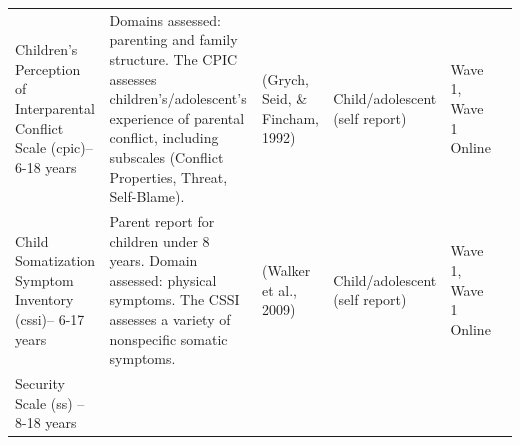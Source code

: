 \documentclass[]{book}
\begin{document}
\begin{longtable}[]{@{}llllll@{}}
\begin{minipage}[t]{0.18\columnwidth}\raggedright
Children's Perception of Interparental Conflict Scale (cpic)-- 6-18 years\strut
\end{minipage} & \begin{minipage}[t]{0.18\columnwidth}\raggedright
Domains assessed: parenting and family structure. The CPIC assesses children's/adolescent's experience of parental conflict, including subscales (Conflict Properties, Threat, Self-Blame).\strut
\end{minipage} & \begin{minipage}[t]{0.15\columnwidth}\raggedright
(Grych, Seid, \& Fincham, 1992)\strut
\end{minipage} & \begin{minipage}[t]{0.16\columnwidth}\raggedright
Child/adolescent (self report)\strut
\end{minipage} & \begin{minipage}[t]{0.06\columnwidth}\raggedright
Wave 1, Wave 1 Online\strut
\end{minipage} & \begin{minipage}[t]{0.10\columnwidth}\raggedright
\strut
\end{minipage}\tabularnewline
\begin{minipage}[t]{0.18\columnwidth}\raggedright
Child Somatization Symptom Inventory (cssi)-- 6-17 years\strut
\end{minipage} & \begin{minipage}[t]{0.18\columnwidth}\raggedright
Parent report for children under 8 years. Domain assessed: physical symptoms. The CSSI assesses a variety of nonspecific somatic symptoms.\strut
\end{minipage} & \begin{minipage}[t]{0.15\columnwidth}\raggedright
(Walker et al., 2009)\strut
\end{minipage} & \begin{minipage}[t]{0.16\columnwidth}\raggedright
Child/adolescent (self report)\strut
\end{minipage} & \begin{minipage}[t]{0.06\columnwidth}\raggedright
Wave 1, Wave 1 Online\strut
\end{minipage} & \begin{minipage}[t]{0.10\columnwidth}\raggedright
\strut
\end{minipage}\tabularnewline
\begin{minipage}[t]{0.18\columnwidth}\raggedright
Security Scale (ss) -- 8-18 years\strut

\end{minipage}
\end{longtable}
\end{document}
